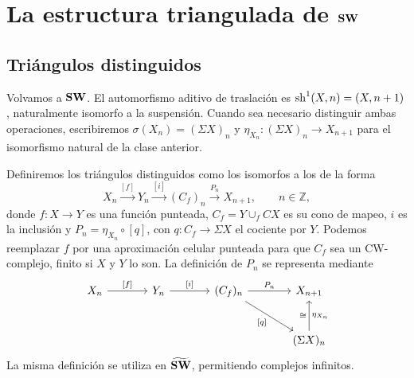 \section{La estructura triangulada de \texorpdfstring{$\mathbf{SW}$}{SW}}

\subsection{Triángulos distinguidos}
Volvamos a $\mathbf{SW}$. El automorfismo aditivo de traslación es $\operatorname{sh}^1(X,n)=(X,n+1)$, naturalmente isomorfo a la suspensión. Cuando sea necesario distinguir ambas operaciones, escribiremos $\sigma(X_n)=(\Sigma X)_n$ y $\eta_{X_n}\colon(\Sigma X)_n\to X_{n+1}$ para el isomorfismo natural de la clase anterior.

Definiremos los triángulos distinguidos como los isomorfos a los de la forma
\[
X_n\xrightarrow{[f]}Y_n\xrightarrow{[i]}(C_f)_n
\xrightarrow{P_n}X_{n+1},\qquad n\in\mathbb Z,
\]
donde $f\colon X\to Y$ es una función punteada, $C_f=Y\cup_f CX$ es su cono de mapeo, $i$ es la inclusión y $P_n=\eta_{X_n}\circ[q]$, con $q\colon C_f\to\Sigma X$ el cociente por $Y$. Podemos reemplazar $f$ por una aproximación celular punteada para que $C_f$ sea un CW-complejo, finito si $X$ y $Y$ lo son. La definición de $P_n$ se representa mediante
\[
\begin{tikzcd}[column sep=large,row sep=large]
X_n \arrow[r,"{[f]}"] & Y_n \arrow[r,"{[i]}"] & (C_f)_n \arrow[r,"P_n"] \arrow[dr,"{[q]}"'] & X_{n+1}\\
& & & (\Sigma X)_n \arrow[u,"\eta_{X_n}"',"\cong"]
\end{tikzcd}
\]
La misma definición se utiliza en $\widetilde{\mathbf{SW}}$, permitiendo complejos infinitos.


